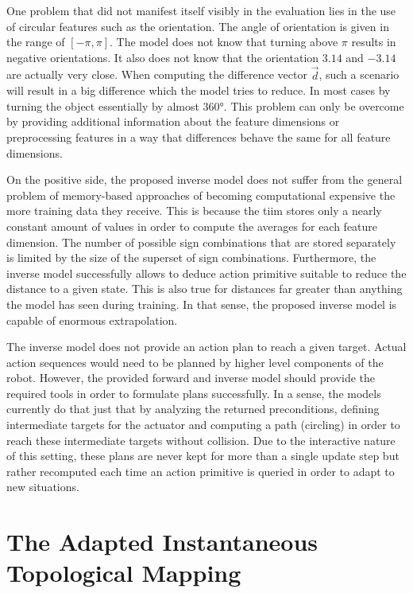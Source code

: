 One problem that did not manifest itself visibly in the evaluation lies in the use of circular features such as the orientation. The angle of orientation is given in the range of $[-\pi,\pi]$. The model does not know that turning above $\pi$ results in negative orientations. It also does not know that the orientation $3.14$ and $-3.14$ are actually very close. When computing the difference vector $\vec{d}$, such a scenario will result in a big difference which the model tries to reduce. In most cases by turning the object essentially by almost 360°. This problem can only be overcome by providing additional information about the feature dimensions or preprocessing features in a way that differences behave the same for all feature dimensions.

On the positive side, the proposed inverse model does not suffer from the general problem of memory-based approaches of becoming computational expensive the more training data they receive. This is because the \gls{tiim} stores only a nearly constant amount of values in order to compute the averages for each feature dimension. The number of possible sign combinations that are stored separately is limited by the size of the superset of sign combinations. Furthermore, the inverse model successfully allows to deduce action primitive suitable to reduce the distance to a given state. This is also true for distances far greater than anything the model has seen during training. In that sense, the proposed inverse model is capable of enormous extrapolation.

The inverse model does not provide an action plan to reach a given target. Actual action sequences would need to be planned by higher level components of the robot. 
However, the provided forward and inverse model should provide the required tools in order to formulate plans successfully.
In a sense, the models currently do that just that by analyzing the returned preconditions, defining intermediate targets for the actuator and computing a path (circling) in order to reach these intermediate targets without collision. Due to the interactive nature of this setting, these plans are never kept for more than a single update step but rather recomputed each time an action primitive is queried in order to adapt to new situations.

\section{The Adapted Instantaneous Topological Mapping \label{sec:discAITM}} 

